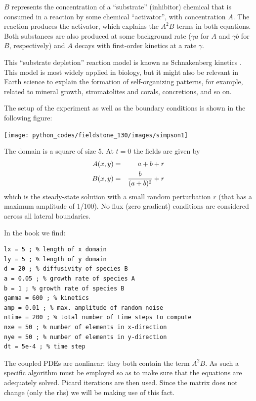$B$ represents the concentration of a ``substrate'' (inhibitor) chemical 
that is consumed in a reaction by some chemical ``activator'',
with concentration $A$. The reaction produces the activator, which explains 
the $A^2B$ terms in both equations. Both substances are also produced 
at some background rate ($\gamma a$ for $A$ and $\gamma b$ for $B$,
respectively) and $A$ decays with first-order kinetics at a rate $\gamma$.

This ``substrate depletion'' reaction
model is known as Schnakenberg kinetics \cite{gime72,schn79}. This
model is most widely applied in biology, but it might also be relevant 
in Earth science to explain
the formation of self-organizing patterns, for example, 
related to mineral growth, stromatolites and
corals, concretions, and so on.

The setup of the experiment as well as the boundary conditions
is shown in the following figure:

\begin{center}
\texttt{[image: python\_codes/fieldstone\_130/images/simpson1]}
\end{center}

The domain is a square of size 5. At $t=0$ the fields are given by
\begin{eqnarray}
A(x,y)&=&a+b+r \nonumber\\
B(x,y)&=& \frac{b}{(a+b)^2} +r
\end{eqnarray}
which is the steady-state solution with a small random 
perturbation $r$ (that has a maximum amplitude
of 1/100). No flux (zero gradient) conditions are considered across 
all lateral boundaries.

In the book we find:
{\small 
\begin{verbatim}
lx = 5 ; % length of x domain
ly = 5 ; % length of y domain
d = 20 ; % diffusivity of species B
a = 0.05 ; % growth rate of species A
b = 1 ; % growth rate of species B
gamma = 600 ; % kinetics
amp = 0.01 ; % max. amplitude of random noise
ntime = 200 ; % total number of time steps to compute
nxe = 50 ; % number of elements in x-direction
nye = 50 ; % number of elements in y-direction
dt = 5e-4 ; % time step
\end{verbatim}
}

The coupled PDEs are nonlinear: they both contain the term $A^2B$. As such 
a specific algorithm must be employed so as to make sure that the 
equations are adequately solved. Picard iterations are then used.
Since the matrix does not change (only the rhs) we will be making use of this fact.

